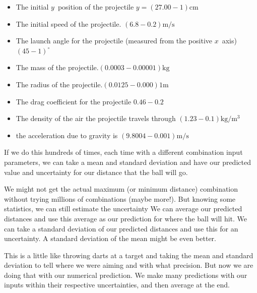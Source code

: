 \documentclass[twoside,11pt,ShortChapTitles]{BYUTextbook}
\begin{document}
\begin{itemize}
\item {\small The initial }$y${\small \ position of the projectile }$%
y=\left( 27.00-1\right) \text{cm}$

\item {\small The initial speed of the projectile. }$\left( 6.8-0.2\right)
\text{m}/\text{s}$

\item {\small The launch angle for the projectile (measured from the
positive }$x${\small \ axis) }$\left( 45-1\right)^\circ$

\item {\small The mass of the projectile.}$\left( 0.0003-0.00001\right)
\text{kg}$

\item {\small The radius of the projectile.}$\left( 0.0125-0.000\right) 1%
\text{m}$

\item {\small The drag coefficient for the projectile }$0.46-0.2$

\item {\small The density of the air the projectile travels through }$\left(
1.23-0.1\right) \text{kg}/\text{m}^{3}$

\item {\small the acceleration due to gravity is }$\left(
9.8004-0.001\right) \text{m}/\text{s}$
\end{itemize}

If we do this hundreds of times, each time with a different combination
input parameters, we can take a mean and standard deviation and have our
predicted value and uncertainty for our distance that the ball will go.

We might not get the actual maximum (or minimum distance) combination
without trying millions of combinations (maybe more!). But knowing some
statistics, we can still estimate the uncertainty We can average our
predicted distances and use this average as our prediction for where the
ball will hit. We can take a standard deviation of our predicted distances
and use this for an uncertainty. A standard deviation of the mean might be
even better.

This is a little like throwing darts at a target and taking the mean and
standard deviation to tell where we were aiming and with what precision. But
now we are doing that with our numerical prediction. We make many
predictions with our inputs within their respective uncertainties, and then
average at the end.
\end{document}
